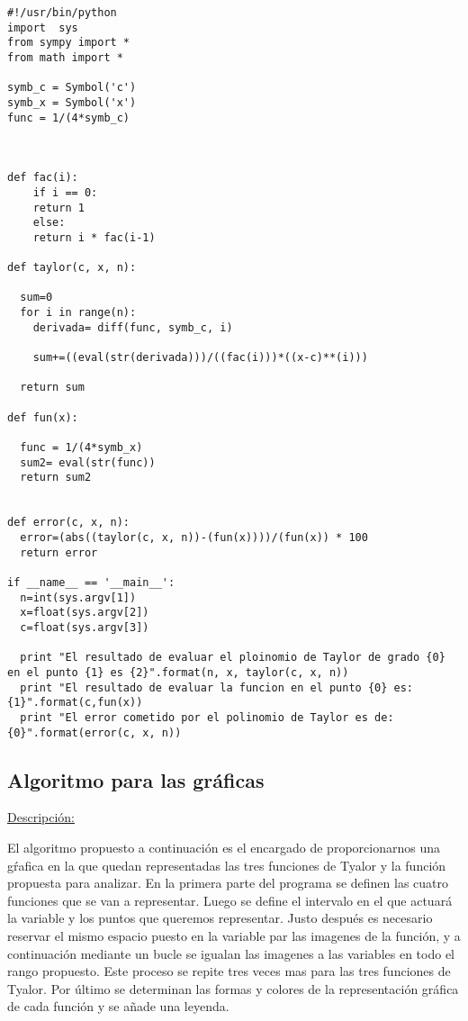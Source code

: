 \documentclass[a4paper,12pt]{article}
\begin{document}
\begin{verbatim}
#!/usr/bin/python
import  sys
from sympy import *
from math import *

symb_c = Symbol('c')
symb_x = Symbol('x')
func = 1/(4*symb_c)



def fac(i):
    if i == 0:
	return 1
    else:
	return i * fac(i-1)
	
def taylor(c, x, n):
  
  sum=0
  for i in range(n):
    derivada= diff(func, symb_c, i)

    sum+=((eval(str(derivada)))/((fac(i)))*((x-c)**(i)))
    
  return sum
  
def fun(x):
  
  func = 1/(4*symb_x)
  sum2= eval(str(func))
  return sum2
  
  
def error(c, x, n):
  error=(abs((taylor(c, x, n))-(fun(x))))/(fun(x)) * 100
  return error
    
if __name__ == '__main__':
  n=int(sys.argv[1])
  x=float(sys.argv[2])
  c=float(sys.argv[3])
    
  print "El resultado de evaluar el ploinomio de Taylor de grado {0} en el punto {1} es {2}".format(n, x, taylor(c, x, n))
  print "El resultado de evaluar la funcion en el punto {0} es: {1}".format(c,fun(x))
  print "El error cometido por el polinomio de Taylor es de: {0}".format(error(c, x, n))
\end{verbatim}
\subsection{Algoritmo para las gráficas}


\underline{Descripción:}

El algoritmo propuesto a continuación es el encargado de proporcionarnos una gŕafica en la que quedan representadas las tres funciones de Tyalor y la función propuesta
para analizar. En la primera parte del programa se definen las cuatro funciones que se van a representar. Luego se define el intervalo en el que actuará la variable y 
los puntos que queremos representar. Justo después es necesario reservar el mismo espacio puesto en la variable par las imagenes de la función, y a continuación mediante un
bucle se igualan las imagenes a las variables en todo el rango propuesto. Este proceso se repite tres veces mas para las tres funciones de Tyalor. Por último se determinan
las formas y colores de la representación gráfica de cada función y se añade una leyenda. 
\end{document}
